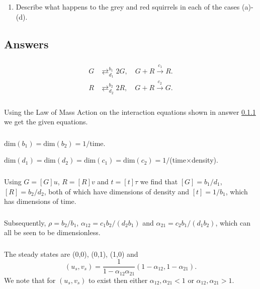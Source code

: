\documentclass[]{article}
\newcommand{\bb}{\begin{equation}}
\newcommand{\ee}{\end{equation}}
\begin{document}
\begin{enumerate}
Use these sketches to determine the stability of $(u_s,v_s)$, when it exists.
\item Describe what happens to the grey and red squirrels in each of the cases (a)-(d).
\end{enumerate}
\begin{Answ}
\subsection{Answers}
\subsubsection{}\label{Interaction_equations}
\begin{align}
G&\mathrel{\mathop{\rightleftarrows}^{b_1}_{d_1}}2G,\quad G+R\stackrel{c_1}{\rightarrow}R.\\
R&\mathrel{\mathop{\rightleftarrows}^{b_2}_{d_2}}2R,\quad G+R\stackrel{c_2}{\rightarrow}G.
\end{align}
\subsubsection{}
Using the Law of Mass Action on the interaction equations shown in answer \ref{Interaction_equations} we get the given equations.
\subsubsection{}
$\textrm{dim}(b_1)=\textrm{dim}(b_2)=1/$time.

\noindent$\textrm{dim}(d_1)=\textrm{dim}(d_2)=\textrm{dim}(c_1)=\textrm{dim}(c_2)=1/$(time$\times$density).

\subsubsection{}
Using $G=[G]u$, $R=[R]v$ and $t= [t]\tau$ we find that $[G]=b_1/d_1$, $[R]=b_2/d_2$, both of which have dimensions of density and $[t]=1/b_1$, which has dimensions of time. 
\subsubsection{}
Subsequently, $\rho=b_2/b_1$, $\alpha_{12}=c_1b_2/(d_2b_1)$ and $\alpha_{21}=c_2b_1/(d_1b_2)$, which can all be seen to be dimensionless.
\subsubsection{}
The steady states are (0,0), (0,1), (1,0) and
\bb
(u_s,v_s)=\frac{1}{1-\alpha_{12}\alpha_{21}}(1-\alpha_{12},1-\alpha_{21}).
\ee
We note that for $(u_s,v_s)$ to exist then either $\alpha_{12}, \alpha_{21}<1$ or $\alpha_{12}, \alpha_{21}>1$.

\end{Answ}
\end{document}
